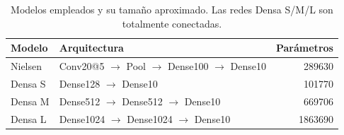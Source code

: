 \begin{table}[H]\centering
\caption{Modelos empleados y su tama\~no aproximado. Las redes Densa S/M/L son totalmente conectadas.}\label{tab:models}
\footnotesize
\setlength{\tabcolsep}{3.5pt}
\begin{tabular}{llr}\toprule
Modelo & Arquitectura & Par\'ametros\\\midrule
Nielsen & Conv20@5 $\to$ Pool $\to$ Dense100 $\to$ Dense10 & \num{289630}\\
Densa S & Dense128 $\to$ Dense10 & \num{101770}\\
Densa M & Dense512 $\to$ Dense512 $\to$ Dense10 & \num{669706}\\
Densa L & Dense1024 $\to$ Dense1024 $\to$ Dense10 & \num{1863690}\\
\bottomrule\end{tabular}
\end{table}
